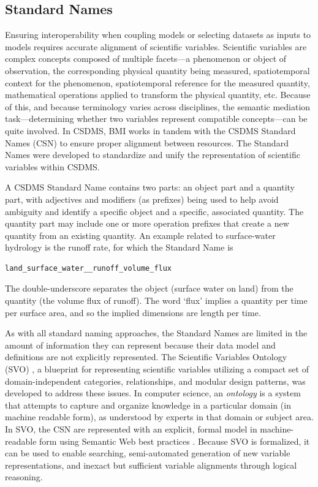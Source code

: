 \documentclass{article} %
\begin{document}
\subsection{Standard Names}

Ensuring interoperability when coupling models or selecting datasets as inputs to models requires accurate alignment of scientific variables. Scientific variables are complex concepts composed of multiple facets---a phenomenon or object of observation, the corresponding physical quantity being measured, spatiotemporal context for the phenomenon, spatiotemporal reference for the measured quantity, mathematical operations applied to transform the physical quantity, etc. Because of this, and because terminology varies across disciplines, the semantic mediation task---determining whether two variables represent compatible concepts---can be quite involved. In CSDMS, BMI works in tandem with the CSDMS Standard Names (CSN) \citep{peckham2013component} to ensure proper alignment between resources. The Standard Names were developed to standardize and unify the representation of scientific variables within CSDMS.

A CSDMS Standard Name contains two parts: an object part and a quantity part, with adjectives and modifiers (as prefixes) being used to help avoid ambiguity and identify a specific object and a specific, associated quantity. The quantity part may include one or more operation prefixes that create a new quantity from an existing quantity. An example related to surface-water hydrology is the runoff rate, for which the Standard Name is

\begin{verbatim}
land_surface_water__runoff_volume_flux
\end{verbatim}
The double-underscore separates the object (surface water on land) from the quantity (the volume flux of runoff). The word `flux' implies a quantity per time per surface area, and so the implied dimensions are length per time. 

As with all standard naming approaches, the Standard Names are limited in the amount of information they can represent because their data model and definitions are not explicitly represented. The Scientific Variables Ontology (SVO) \citep{stoica2018ontology, stoica2019scientific, stoica2019incorporating, stoica2020github, svoweb}, a blueprint for representing scientific variables utilizing a compact set of domain-independent categories, relationships, and modular design patterns, was developed to address these issues. In computer science, an \textit{ontology} is a system that attempts to capture and organize knowledge in a particular domain (in machine readable form), as understood by experts in that domain or subject area. In SVO, the CSN are represented with an explicit, formal model in machine-readable form using Semantic Web best practices \citep{berrueta2008best}. Because SVO is formalized, it can be used to enable searching, semi-automated generation of new variable representations, and inexact but sufficient variable alignments through logical reasoning.
\end{document}
